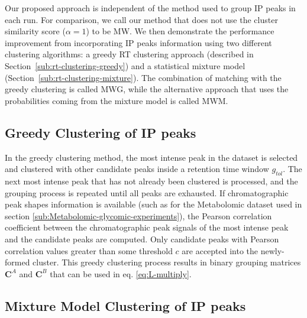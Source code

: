 Our proposed approach is independent of the method used to group IP peaks in each run. For comparison, we call our method that does not use the cluster similarity score ($\alpha=1$) to be \ac{MW}. We then demonstrate the performance improvement from incorporating IP peaks information using two different clustering algorithms: a greedy RT clustering approach (described in Section~\ref{sub:rt-clustering-greedy}) and a statistical mixture model (Section~\ref{sub:rt-clustering-mixture}). The combination of matching with the greedy clustering is called MWG, while the alternative approach that uses the probabilities coming from the mixture model is called MWM.

\subsection{Greedy Clustering of IP peaks\label{sub:rt-clustering-greedy}}

In the greedy clustering method, the most intense peak in the dataset is selected and clustered with other candidate peaks inside a retention time window $g_{tol}$. The next most intense peak that has not already been clustered is processed, and the grouping process is repeated until all peaks are exhausted. If chromatographic peak shapes information is available (such as for the Metabolomic dataset used in section \ref{sub:Metabolomic-glycomic-experiments}), the Pearson correlation coefficient between the chromatographic peak signals of the most intense peak and the candidate peaks are computed. Only candidate peaks with Pearson correlation values greater than some threshold $c$ are accepted into the newly-formed cluster. This greedy clustering process results in binary grouping matrices $\mathbf{C}^A$ and $\mathbf{C}^B$ that can be used in eq. \ref{eq:L-multiply}.

\subsection{Mixture Model Clustering of IP peaks\label{sub:rt-clustering-mixture}}


